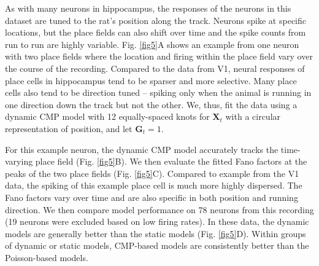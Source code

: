 \documentclass[aoas]{imsart}
\theoremstyle{plain}
\theoremstyle{remark}
\begin{document}
As with many neurons in hippocampus, the responses of the neurons in this dataset are tuned to the rat’s position along the track. Neurons spike at specific locations, but the place fields can also shift over time and the spike counts from run to run are highly variable. Fig. \ref{fig5}A shows an example from one neuron with two place fields where the location and firing within the place field vary over the course of the recording. Compared to the data from V1, neural responses of place cells in hippocampus tend to be sparser and more selective. Many place cells also tend to be direction tuned – spiking only when the animal is running in one direction down the track but not the other. We, thus, fit the data using a dynamic CMP model with 12 equally-spaced knots for $\bm{X}_t$ with a circular representation of position, and let $\bm{G}_t=1$.

For this example neuron, the dynamic CMP model accurately tracks the time-varying place field (Fig. \ref{fig5}B). We then evaluate the fitted Fano factors at the peaks of the two place fields (Fig. \ref{fig5}C). Compared to example from the V1 data, the spiking of this example place cell is much more highly dispersed. The Fano factors vary over time and are also specific in both position and running direction. We then compare model performance on 78 neurons from this recording (19 neurons were excluded based on low firing rates). In these data, the dynamic models are generally better than the static models (Fig. \ref{fig5}D). Within groups of dynamic or static models, CMP-based models are consistently better than the Poisson-based models.
\end{document}
